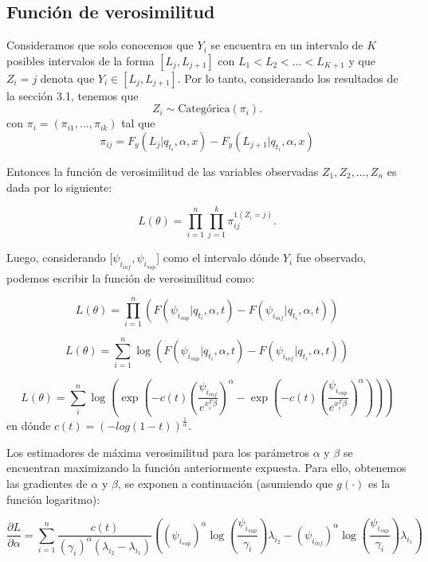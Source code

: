 \documentclass{report}
\begin{document}
\subsection{Función de verosimilitud}
Consideramos que solo conocemos que $Y_{i}$ se encuentra en un intervalo de $K$ posibles intervalos de la forma $[L_{j},L_{j+1}]$ con $L_1 < L_2 < \dots < L_{K+1}$ y que $Z_{i}=j$ denota que $Y_{i} \in [L_{j},L_{j+1}]$. Por lo tanto, considerando los resultados de la sección 3.1, tenemos que
\[Z_{i} \sim \text{Categórica}(\pi_{i}).\]
\noindent con $\pi_{i}=\left( \pi_{i1},\dots, \pi_{ik} \right)$ tal que
\begin{equation}
\pi_{ij} = F_{y}(L_{j}|q_{t_{i}},\alpha,x) - F_{y}\left( L_{j+1}|q_{t_{i}},\alpha,x \right)
\end{equation}

Entonces la función de verosimilitud de las variables observadas $Z_{1},Z_{2},\dots,Z_{n}$ es dada por lo siguiente:

\[L(\theta)=\prod_{i=1}^{n}\prod_{j=1}^{k} \pi_{ij}^{1\left( Z_{i}=j \right)}.\]

Luego, considerando  [$\psi_{i_{inf}},\psi_{i_{sup}}$] como el intervalo dónde $Y_{i}$ fue observado, podemos escribir la función de verosimilitud como:

\[L\left( \theta\right)=\prod_{i=1}^{n}\left( F(\psi_{i_{sup}}|q_{t_{i}},\alpha,t) - F(\psi_{i_{inf}}|q_{t_{i}},\alpha,t) \right) \]

\[L(\theta)=\sum_{i=1}^{n} \log \left( F(\psi_{i_{sup}}|q_{t_{i}},\alpha,t) - F\left( \psi_{i_{inf}}|q_{t_{i}},\alpha,t \right) \right)\]

\[L(\theta)=\sum_{i}^{n} \log \left( \exp\left( -c(t)\left( \frac{\psi_{i_{inf}}}{e^{x_{i}^{T}\beta}} \right)^{\alpha} - \exp\left( -c(t)\left( \frac{\psi_{i_{sup}}}{e^{x_{i}^{T}\beta}} \right)^{\alpha} \right) \right) \right)\]
\noindent en dónde $c(t)=(-log(1-t))^{\frac{1}{\alpha}}$.

Los estimadores de máxima verosimilitud para los parámetros $\alpha$ y $\beta$ se encuentran maximizando la función anteriormente expuesta. Para ello, obtenemos las gradientes de $\alpha$ y $\beta$, se exponen a continuación (asumiendo que $g(\cdot)$ es la función logaritmo):

\[\frac{\partial L}{\partial \alpha}=\sum_{i=1}^{n} \frac{c(t)}{(\gamma_{i})^{\alpha}(\lambda_{i_{2}}-\lambda_{i_{1}})}\left( (\psi_{i_{sup}})^{\alpha} \log\left( \frac{\psi_{i_{sup}}}{\gamma_{i}} \right) \lambda_{i_{2}} - (\psi_{i_{inf}})^{\alpha} \log\left( \frac{\psi_{i_{sup}}}{\gamma_{i}} \right) \lambda_{i_{1}}\right)\]
\end{document}
